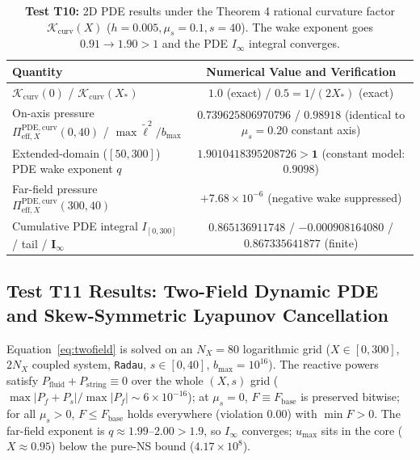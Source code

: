 \documentclass[12pt,a4paper]{article}
\begin{document}
\begin{table}[htbp]
\centering
\footnotesize
\setlength{\tabcolsep}{2pt}
\caption{\textbf{Test T10:} 2D PDE results under the Theorem 4 rational curvature factor $\mathcal{K}_{\mathrm{curv}}(X)$ ($h=0.005, \mu_s=0.1, s=40$). The wake exponent goes $0.91 \to 1.90 > 1$ and the PDE $I_\infty$ integral converges.}
\vspace{0.1cm}
\begin{tabular}{@{}l|c@{}}
\hline
Quantity & Numerical Value and Verification \\
\hline
$\mathcal{K}_{\mathrm{curv}}(0)$ / $\mathcal{K}_{\mathrm{curv}}(X_*)$ & $1.0$ (exact) / $0.5 = 1/(2X_*)$ (exact) \\
\shortstack{On-axis pressure \\ $\Pi_{\mathrm{eff}, X}^{\mathrm{PDE, curv}}(0, 40)$ / $\max \tilde{\ell}^2/b_{\max}$} & \shortstack{$0.739625806970796$ / $0.98918$ \\ (identical to $\mu_s=0.20$ constant axis)} \\
Extended-domain ($[50, 300]$) PDE wake exponent $q$ & \shortstack{$\mathbf{1.9010418395208726 > 1}$ \\ (constant model: $0.9098$)} \\
Far-field pressure $\Pi_{\mathrm{eff}, X}^{\mathrm{PDE, curv}}(300, 40)$ & $+7.68\times 10^{-6}$ (negative wake suppressed) \\
Cumulative PDE integral $I_{[0,300]}$ / tail / $\mathbf{I_\infty}$ & \shortstack{$0.865136911748$ / $-0.000908164080$ / \\ $\mathbf{0.867335641877}$ (finite)} \\
\hline
\end{tabular}
\end{table}

\subsection{Test T11 Results: Two-Field Dynamic PDE and Skew-Symmetric Lyapunov Cancellation}

Equation~\eqref{eq:twofield} is solved on an $N_X = 80$ logarithmic grid ($X \in [0, 300]$, $2 N_X$ coupled system, \texttt{Radau}, $s \in [0, 40]$, $b_{\max} = 10^{16}$). The reactive powers satisfy $P_{\mathrm{fluid}} + P_{\mathrm{string}} \equiv 0$ over the whole $(X, s)$ grid ($\max|P_f+P_s|/\max|P_f| \sim 6 \times 10^{-16}$); at $\mu_s = 0$, $F \equiv F_{\mathrm{base}}$ is preserved bitwise; for all $\mu_s > 0$, $F \le F_{\mathrm{base}}$ holds everywhere (violation $0.00$) with $\min F > 0$. The far-field exponent is $q \approx 1.99\text{--}2.00 > 1.9$, so $I_\infty$ converges; $u_{\max}$ sits in the core ($X \approx 0.95$) below the pure-NS bound ($4.17 \times 10^8$).
\end{document}
